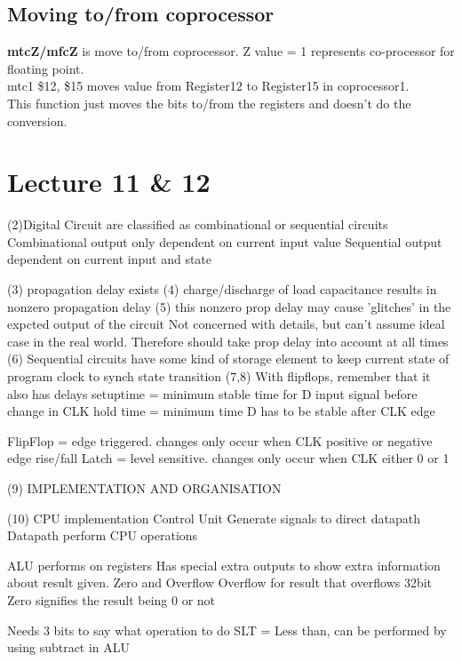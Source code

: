 \documentclass{article}
\begin{document}
	\subsection*{Moving to/from coprocessor}
	\textbf{mtcZ/mfcZ} is move to/from coprocessor. Z value = 1 represents co-processor for floating point.\\

	mtc1 \$12, \$15 moves value from Register12 to Register15 in coprocessor1.\\

	This function just moves the bits to/from the registers and doesn't do the conversion.

\section*{Lecture 11 \& 12}
	(2)Digital Circuit are classified as combinational or sequential circuits
		Combinational	output only dependent on current input value
		Sequential 	output dependent on current input and state

	(3) propagation delay exists
	(4) charge/discharge of load capacitance results in nonzero propagation delay
	(5) this nonzero prop delay may cause 'glitches' in the expcted output of the circuit
		Not concerned with details, but can't assume ideal case in the real world. Therefore should take prop delay into account at all times
	(6) Sequential circuits
		have some kind of storage element to keep current state of program
		clock to synch state transition
	(7,8) With flipflops, remember that it also has delays
		setuptime = minimum stable time for D input signal before change in CLK
		hold time = minimum time D has to be stable after CLK edge

		FlipFlop = edge triggered. changes only occur when CLK positive or negative edge rise/fall
		Latch = level sensitive. changes only occur when CLK either 0 or 1

	(9) IMPLEMENTATION AND ORGANISATION

	(10) CPU implementation
		Control Unit
			Generate signals to direct datapath
		Datapath
			perform CPU operations

		ALU performs on registers
			Has special extra outputs to show extra information about result given. Zero and Overflow
			Overflow for result that overflows 32bit
			Zero signifies the result being 0 or not

			Needs 3 bits to say what operation to do
			SLT = Less than, can be performed by using subtract in ALU
\end{document}
